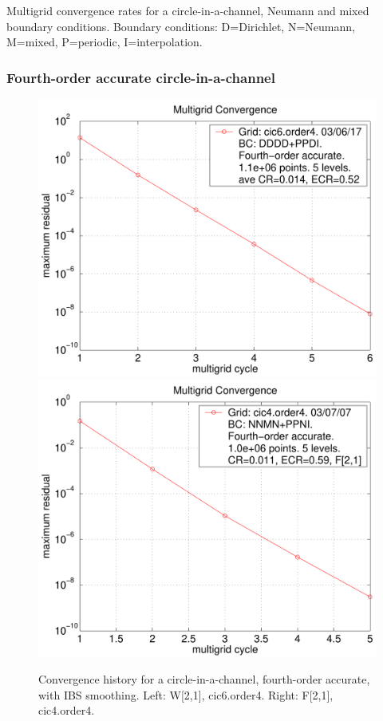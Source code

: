 \begin{table}[hbt]
\begin{center}
{}%
\end{center}
\caption{Multigrid convergence rates for a circle-in-a-channel, Neumann and mixed boundary conditions.
    Boundary conditions: D=Dirichlet, N=Neumann, M=mixed, P=periodic, I=interpolation. }
 \label{tab:cicNeumann} 
\end{table}




\clearpage
\subsubsection{Fourth-order accurate circle-in-a-channel}

\begin{figure}[hbt]
\begin{center}
  \includegraphics[width=.475\linewidth]{fig/residual_cic6_order4}
  \includegraphics[width=.475\linewidth]{fig/residual_cic4_mixed_order4}
  \end{center} 
\caption{Convergence history for a circle-in-a-channel, fourth-order accurate, with IBS smoothing. Left: W[2,1], cic6.order4.
    Right: F[2,1], cic4.order4. }
\label{fig:square1024}
\end{figure}

